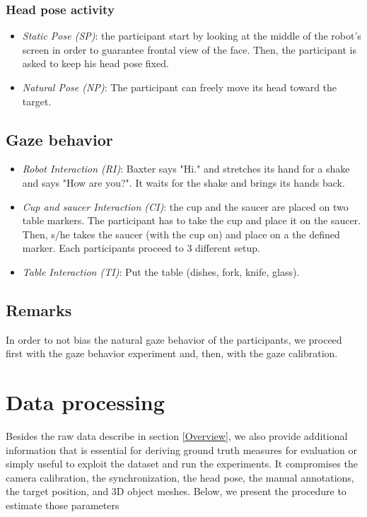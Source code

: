 \documentclass[11pt,a4paper]{article}
\begin{document}
\subsubsection{Head pose activity}
\begin{itemize}
\item \textit{Static Pose (SP)}: the participant start by looking at the middle of the robot's screen in order to guarantee frontal view of the face. Then, the participant is asked to keep his head pose fixed.
\item \textit{Natural Pose (NP)}: The participant can freely move its head toward the target.
\end{itemize}
\subsection{Gaze behavior}
\begin{itemize}
\item \textit{Robot Interaction (RI)}: Baxter says "Hi." and stretches its hand for a shake and says "How are you?". It waits for the shake and brings its hands back.
\item \textit{Cup and saucer Interaction (CI)}: the cup and the saucer are placed on two table markers. The participant has to take the cup and place it on the saucer. Then, s/he takes the saucer (with the cup on) and place on a the defined marker. Each participants proceed to 3 different setup.
\item \textit{Table Interaction (TI)}: Put the table (dishes, fork, knife, glass).
\end{itemize}

\subsection{Remarks}
In order to not bias the natural gaze behavior of the participants, we proceed first with the gaze behavior experiment and, then, with the gaze calibration.

\section{Data processing}
Besides the raw data describe in section \ref{Overview}, we also provide additional information that is essential for deriving ground truth measures for evaluation or simply useful to exploit the dataset and run the experiments. It compromises the camera calibration, the synchronization, the head pose, the manual annotations, the target position, and 3D object meshes. Below, we present the procedure to estimate those parameters
\end{document}
